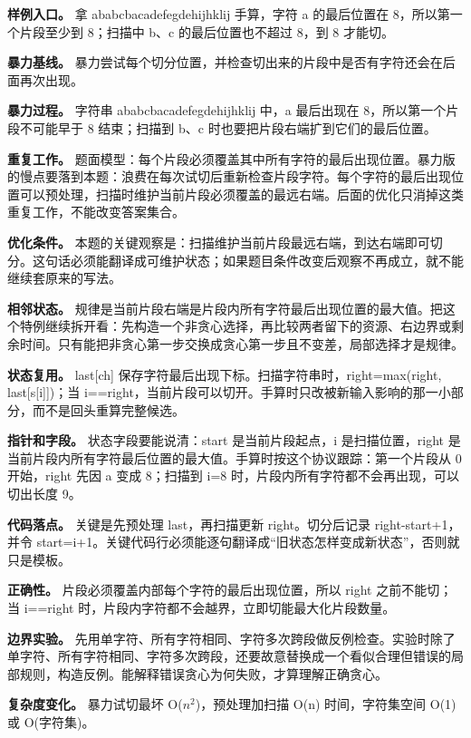 \textbf{样例入口。} 拿 ababcbacadefegdehijhklij 手算，字符 a 的最后位置在 8，所以第一个片段至少到 8；扫描中 b、c 的最后位置也不超过 8，到 8 才能切。

\textbf{暴力基线。} 暴力尝试每个切分位置，并检查切出来的片段中是否有字符还会在后面再次出现。

\textbf{暴力过程。} 字符串 ababcbacadefegdehijhklij 中，a 最后出现在 8，所以第一个片段不可能早于 8 结束；扫描到 b、c 时也要把片段右端扩到它们的最后位置。

\textbf{重复工作。} 题面模型：每个片段必须覆盖其中所有字符的最后出现位置。暴力版的慢点要落到本题：浪费在每次试切后重新检查片段字符。每个字符的最后出现位置可以预处理，扫描时维护当前片段必须覆盖的最远右端。后面的优化只消掉这类重复工作，不能改变答案集合。

\textbf{优化条件。} 本题的关键观察是：扫描维护当前片段最远右端，到达右端即可切分。这句话必须能翻译成可维护状态；如果题目条件改变后观察不再成立，就不能继续套原来的写法。

\textbf{相邻状态。} 规律是当前片段右端是片段内所有字符最后出现位置的最大值。把这个特例继续拆开看：先构造一个非贪心选择，再比较两者留下的资源、右边界或剩余时间。只有能把非贪心第一步交换成贪心第一步且不变差，局部选择才是规律。

\textbf{状态复用。} last[ch] 保存字符最后出现下标。扫描字符串时，right=max(right, last[s[i]])；当 i==right，当前片段可以切开。手算时只改被新输入影响的那一小部分，而不是回头重算完整候选。

\textbf{指针和字段。} 状态字段要能说清：start 是当前片段起点，i 是扫描位置，right 是当前片段内所有字符最后位置的最大值。手算时按这个协议跟踪：第一个片段从 0 开始，right 先因 a 变成 8；扫描到 i=8 时，片段内所有字符都不会再出现，可以切出长度 9。

\textbf{代码落点。} 关键是先预处理 last，再扫描更新 right。切分后记录 right-start+1，并令 start=i+1。关键代码行必须能逐句翻译成“旧状态怎样变成新状态”，否则就只是模板。

\textbf{正确性。} 片段必须覆盖内部每个字符的最后出现位置，所以 right 之前不能切；当 i==right 时，片段内字符都不会越界，立即切能最大化片段数量。

\textbf{边界实验。} 先用单字符、所有字符相同、字符多次跨段做反例检查。实验时除了单字符、所有字符相同、字符多次跨段，还要故意替换成一个看似合理但错误的局部规则，构造反例。能解释错误贪心为何失败，才算理解正确贪心。

\textbf{复杂度变化。} 暴力试切最坏 O(\ensuremath{n^{2}})，预处理加扫描 O(n) 时间，字符集空间 O(1) 或 O(字符集)。

